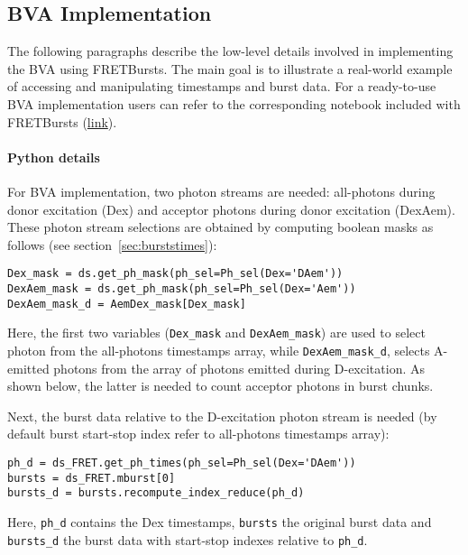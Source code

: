 \subsection{BVA Implementation}

The following paragraphs describe the low-level details involved in implementing the BVA using FRETBursts.
The main goal is to illustrate a real-world example of accessing and manipulating timestamps and burst data.
For a ready-to-use BVA implementation users can refer to the corresponding notebook included with FRETBursts
(\href{http://nbviewer.jupyter.org/github/tritemio/FRETBursts_notebooks/blob/master/notebooks/Example%20-%20Burst%20Variance%20Analysis.ipynb}{link}).

\paragraph{Python details}
For BVA implementation, two photon streams are needed: all-photons during donor excitation (Dex) 
and acceptor photons during donor excitation (DexAem). 
These photon stream selections are obtained by computing boolean masks as follows 
(see section~\ref{sec:burststimes}):

\begin{lstlisting}
Dex_mask = ds.get_ph_mask(ph_sel=Ph_sel(Dex='DAem'))   
DexAem_mask = ds.get_ph_mask(ph_sel=Ph_sel(Dex='Aem'))
DexAem_mask_d = AemDex_mask[Dex_mask]
\end{lstlisting}

Here, the first two variables (\verb|Dex_mask| and \verb|DexAem_mask|) are used to
select photon from the all-photons timestamps array,
while \verb|DexAem_mask_d|, selects A-emitted photons from the
array of photons emitted during D-excitation. As shown below, 
the latter is needed to count acceptor photons in burst chunks.

Next, the burst data relative to the D-excitation photon stream is needed (by default 
burst start-stop index refer to all-photons timestamps array):

\begin{lstlisting}
ph_d = ds_FRET.get_ph_times(ph_sel=Ph_sel(Dex='DAem'))
bursts = ds_FRET.mburst[0] 
bursts_d = bursts.recompute_index_reduce(ph_d)
\end{lstlisting}

Here, \verb|ph_d| contains the Dex timestamps, \verb|bursts| the original burst data and 
\verb|bursts_d| the burst data with start-stop indexes relative to \verb|ph_d|.


